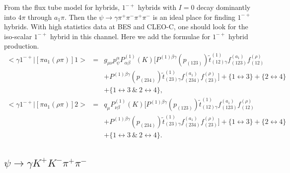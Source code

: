 From the flux tube model for hybrids, $1^{-+}$ hybrids with $I=0$
decay dominantly into $4\pi$ through $a_1\pi$. Then the
$\psi\to\gamma\pi^+\pi^-\pi^+\pi^-$ is an ideal place for finding
$1^{-+}$ hybrids. With high statistics data at BES and CLEO-C, one
should look for the iso-scalar $1^{-+}$ hybrid in this channel.
Here we add the formulae for $1^{-+}$ hybrid production.
\begin{eqnarray}
<\gamma 1^{-+}|[\pi a_1(\rho\pi)]1> \!&=&\!
g_{\mu\nu}p_\psi^\alpha P^{(1)}_{\alpha\beta}(K)
[P^{(1)\beta\gamma}(p_{(123)}) \tilde
t^{(1)}_{(12)\gamma}f^{(a_1)}_{(123)}f^{(\rho)}_{(12)} \nonumber\\
& & +P^{(1)\beta\gamma}(p_{(234)}) \tilde
t^{(1)}_{(23)\gamma}f^{(a_1)}_{(234)}f^{(\rho)}_{(23)}]
 +\{1\leftrightarrow 3\}+\{2\leftrightarrow 4\}\nonumber\\& &
+\{1\leftrightarrow 3 ~\&~ 2\leftrightarrow 4\},\\
<\gamma 1^{-+}|[\pi a_1(\rho\pi)]2> \!&=&\! q_\mu
P^{(1)}_{\nu\beta}(K) [P^{(1)\beta\gamma}(p_{(123)}) \tilde
t^{(1)}_{(12)\gamma}f^{(a_1)}_{(123)}f^{(\rho)}_{(12)} \nonumber\\
& & +P^{(1)\beta\gamma}(p_{(234)}) \tilde
t^{(1)}_{(23)\gamma}f^{(a_1)}_{(234)}f^{(\rho)}_{(23)}]
 +\{1\leftrightarrow 3\}+\{2\leftrightarrow 4\}\nonumber\\& &
+\{1\leftrightarrow 3 ~\&~ 2\leftrightarrow 4\}.
\end{eqnarray}

\subsection{$\psi\to\gamma K^+K^-\pi^+\pi^-$ }

